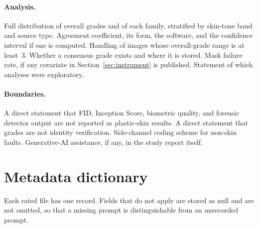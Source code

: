\documentclass[10pt,twocolumn]{article}
\begin{document}
\paragraph{Analysis.}
Full distribution of overall grades and of each family, stratified by skin-tone band and source type.
Agreement coefficient, its form, the software, and the confidence interval if one is computed.
Handling of images whose overall-grade range is at least~3.
Whether a consensus grade exists and where it is stored.
Mask failure rate, if any covariate in Section~\ref{sec:instrument} is published.
Statement of which analyses were exploratory.

\paragraph{Boundaries.}
A direct statement that FID, Inception Score, biometric quality, and forensic detector output are not reported as plastic-skin results.
A direct statement that grades are not identity verification.
Side-channel coding scheme for non-skin faults.
Generative-AI assistance, if any, in the study report itself.

\section{Metadata dictionary}
\label{app:meta}

Each rated file has one record. Fields that do not apply are stored as null and are not omitted, so that a missing prompt is distinguishable from an unrecorded prompt.
\end{document}

